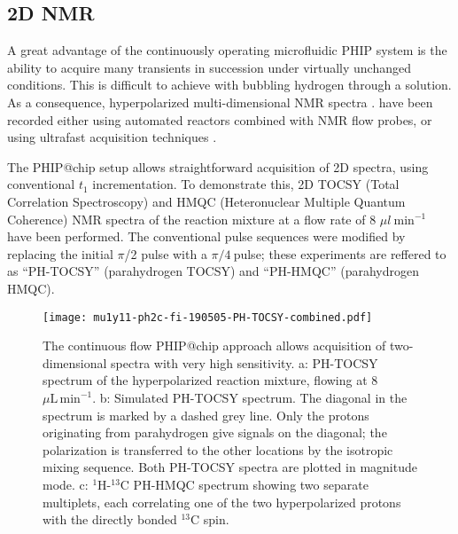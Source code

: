 \subsection{2D NMR}

A great advantage of the continuously operating microfluidic PHIP system is the
ability to acquire many transients in succession under virtually unchanged
conditions.
This is difficult to achieve with bubbling hydrogen through a solution.
As a consequence, hyperpolarized multi-dimensional NMR spectra \cite{Mishkovsky:2008cl,Giraudeau:2009fn,Roth:2010hk,Lloyd:2012cf,Eshuis:2015ce,Kiryutin:2019hy}. have been recorded
either using automated reactors combined with NMR flow probes, \cite{Lloyd:2012cf,Eshuis:2015ce}
or using ultrafast acquisition techniques \cite{Mishkovsky:2008cl,Giraudeau:2009fn,Kiryutin:2019hy}.

The PHIP@chip setup allows straightforward acquisition of 2D spectra, using
conventional $t_1$ incrementation.
To demonstrate this, 2D TOCSY (Total Correlation
Spectroscopy) and HMQC (Heteronuclear Multiple Quantum Coherence) NMR spectra
of the reaction mixture at a flow rate of 8 $\mu{l}~\text{min}^{-1}$ have been performed.
The conventional
pulse sequences were modified by replacing the initial \(\pi\)/2 pulse with a
\(\pi/4\ \)pulse; these experiments are reffered to as ``PH-TOCSY'' (parahydrogen TOCSY) and
``PH-HMQC'' (parahydrogen HMQC).

\begin{figure}
	\centering
	\texttt{[image: mu1y11-ph2c-fi-190505-PH-TOCSY-combined.pdf]}
	\caption{
		The continuous flow PHIP@chip approach allows acquisition of
		two-dimensional spectra with very high sensitivity.
    a: PH-TOCSY spectrum of the hyperpolarized reaction mixture,
		flowing at 8~$\mu\mathrm{L}\,\text{min}^{-1}$.
    b: Simulated PH-TOCSY spectrum. The diagonal in the spectrum is marked by a dashed grey
		line. Only the protons originating from parahydrogen give signals on
		the diagonal; the polarization is transferred to the other locations by
		the isotropic mixing sequence. Both PH-TOCSY spectra are plotted in
    magnitude mode.
    c: $^1$H-$^{13}$C PH-HMQC spectrum
		showing two separate multiplets, each correlating one of the two
		hyperpolarized protons with the directly bonded $^{13}$C spin.
}
	\label{fig:PH-TOCSY-HMQC}
\end{figure}

